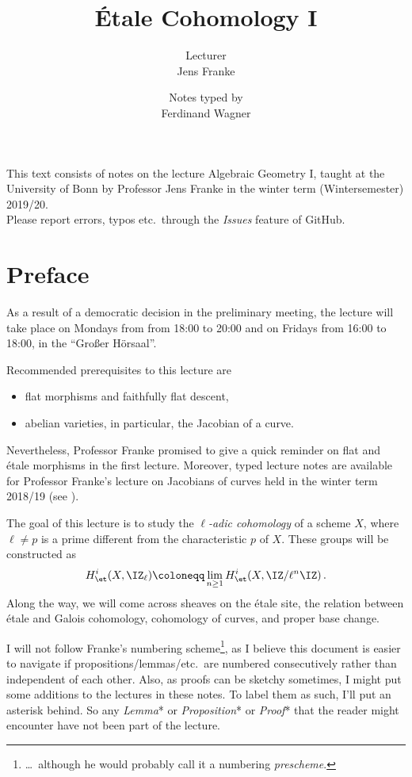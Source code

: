 \documentclass[a4paper, 10pt, oneside, DIV=9, chapterprefix=true, numbers=enddot]{scrbook}
\title{Étale Cohomology I}
\author{{\normalsize Lecturer}\\
	Jens Franke}
\date{{\normalsize Notes typed by}\\
	Ferdinand Wagner}
\begin{document}
	\frontmatter
	\maketitle
	\noindent This text consists of notes on the lecture Algebraic Geometry I, taught at the University of
	Bonn by Professor Jens Franke in the winter term (Wintersemester) 2019/20.\\[\thmsep]Please report errors, typos etc.\ through the \emph{Issues} feature of GitHub.
	
	
	\tableofcontents
	\chapter{Preface}
	As a result of a democratic decision in the preliminary meeting, the lecture will take place on Mondays from from 18:00 to 20:00 and on Fridays from 16:00 to 18:00, in the \enquote{Großer Hörsaal}.
	
	Recommended prerequisites to this lecture are
	\begin{itemize}
		\item flat morphisms and faithfully flat descent,
		\item abelian varieties, in particular, the Jacobian of a curve.
	\end{itemize}
	Nevertheless, Professor Franke promised to give a quick reminder on flat and étale morphisms in the first lecture. Moreover, typed lecture notes are available for Professor Franke's lecture on Jacobians of curves held in the winter term 2018/19 (see \cite{jacobians}). 
	
	The goal of this lecture is to study the \emph{$\ell$-adic cohomology} of a scheme $X$, where $\ell\neq p$ is a prime different from the characteristic $p$ of $X$. These groups will be constructed as
	\begin{align*}
		H_\et^i(X,\IZ_\ell)\coloneqq\lim_{n\geq 1}H_\et^i(X,\IZ/\ell^n\IZ)\,.
	\end{align*}
	Along the way, we will come across sheaves on the étale site, the relation between étale and Galois cohomology, cohomology of curves, and proper base change.
	
	I will not follow Franke's numbering scheme\footnote{\ldots\ although he would probably call it a numbering \emph{prescheme}.}, as I believe this document is easier to navigate if propositions/lemmas/etc.\ are numbered consecutively rather than independent of each other. Also, as proofs can be sketchy sometimes, I might put some additions to the lectures in these notes. To label them as such, I'll put an asterisk behind. So any \emph{Lemma}* or \emph{Proposition}* or \emph{Proof}* that the reader might encounter have not been part of the lecture.
	
\end{document}
